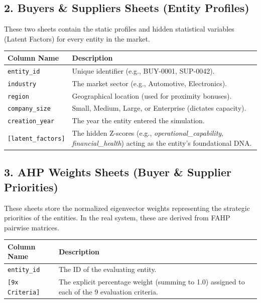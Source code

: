\documentclass[11pt]{article}
\begin{document}
\subsection{2. Buyers \& Suppliers Sheets (Entity Profiles)}
These two sheets contain the static profiles and hidden statistical variables (Latent Factors) for every entity in the market.
\begin{table}[h]
\centering
\begin{tabularx}{\textwidth}{lX}
\toprule
\textbf{Column Name} & \textbf{Description} \\
\midrule
\texttt{entity\_id} & Unique identifier (e.g., BUY-0001, SUP-0042). \\
\texttt{industry} & The market sector (e.g., Automotive, Electronics). \\
\texttt{region} & Geographical location (used for proximity bonuses). \\
\texttt{company\_size} & Small, Medium, Large, or Enterprise (dictates capacity). \\
\texttt{creation\_year} & The year the entity entered the simulation. \\
\texttt{[latent\_factors]} & The hidden Z-scores (e.g., \textit{operational\_capability}, \textit{financial\_health}) acting as the entity's foundational DNA. \\
\bottomrule
\end{tabularx}
\end{table}

\subsection{3. AHP Weights Sheets (Buyer \& Supplier Priorities)}
These sheets store the normalized eigenvector weights representing the strategic priorities of the entities. In the real system, these are derived from FAHP pairwise matrices.
\begin{table}[h]
\centering
\begin{tabularx}{\textwidth}{lX}
\toprule
\textbf{Column Name} & \textbf{Description} \\
\midrule
\texttt{entity\_id} & The ID of the evaluating entity. \\
\texttt{[9x Criteria]} & The explicit percentage weight (summing to 1.0) assigned to each of the 9 evaluation criteria. \\
\bottomrule
\end{tabularx}
\end{table}
\end{document}
